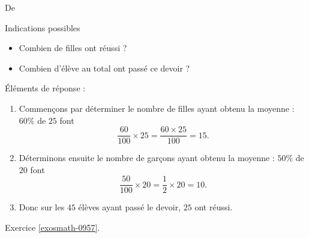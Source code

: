 
De \cite{NRHooXFvgpp4}

Indications possibles
\begin{itemize}
    \item Combien de filles ont réussi ?
    \item Combien d'élève au total ont passé ce devoir ?
\end{itemize}

Éléments de réponse :
\begin{enumerate}
    \item
        Commençons par déterminer le nombre de filles ayant obtenu la moyenne : \( 60\%\) de \( 25\) font
        \begin{equation}
            \frac{ 60 }{ 100 }\times 25=\frac{ 60\times 25 }{ 100 }=15.
        \end{equation}
    \item
        Déterminons ensuite le nombre de garçons ayant obtenu la moyenne : \( 50\%\) de \( 20\) font
        \begin{equation}
            \frac{ 50 }{ 100 }\times 20=\frac{ 1 }{2}\times 20=10.
        \end{equation}
    \item
        Donc sur les \( 45\) élèves ayant passé le devoir, \( 25\) ont réussi.
\end{enumerate}

Exercice \ref{exosmath-0957}.

